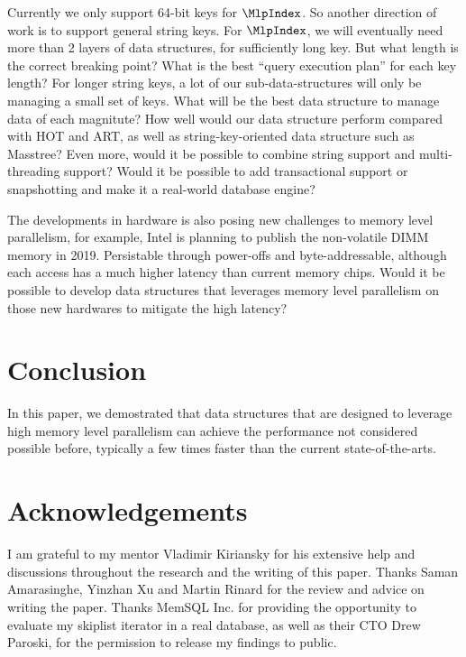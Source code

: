 \documentclass[11pt, usletter]{article}
\begin{document}
Currently we only support 64-bit keys for $\MlpIndex$. 
So another direction of work is to support general string keys. 
For $\MlpIndex$, we will eventually need more than 2 layers of data structures, 
for sufficiently long key. But what length is the correct breaking point?
What is the best ``query execution plan'' for each key length?
For longer string keys, a lot of our sub-data-structures will only be managing a small set of keys. 
What will be the best data structure to manage data of each magnitute? 
How well would our data structure perform compared with HOT and ART, 
as well as string-key-oriented data structure such as Masstree?
Even more, would it be possible to combine string support and multi-threading support?
Would it be possible to add transactional support or snapshotting and make it a 
real-world database engine? 

The developments in hardware is also posing new challenges to memory level parallelism, 
for example, Intel is planning to publish the non-volatile DIMM memory in 2019.
Persistable through power-offs and byte-addressable, 
although each access has a much higher latency than current memory chips. 
Would it be possible to develop data structures that leverages memory level parallelism 
on those new hardwares to mitigate the high latency? 

\section{Conclusion} \label{conclusion}

In this paper, we demostrated that data structures that are designed to leverage high memory level parallelism 
can achieve the performance not considered possible before, 
typically a few times faster than the current state-of-the-arts. 

\section*{Acknowledgements}

I am grateful to my mentor Vladimir Kiriansky for his extensive help and discussions throughout the research 
and the writing of this paper. Thanks Saman Amarasinghe, Yinzhan Xu and Martin Rinard for the review and advice on writing the paper. 
Thanks MemSQL Inc. for providing the opportunity to evaluate my skiplist iterator in a real database, 
as well as their CTO Drew Paroski, for the permission to release my findings to public.

{}

\end{document}
